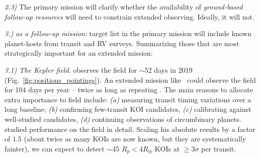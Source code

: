 \textit{2.3)} 
The primary mission will clarify whether the availability of \textit{ground-based follow-up resources} will need to constrain \tesss extended observing.
Ideally, it will not.

\textit{3.) \tess as a follow-up mission:}
\tesss target list in the primary mission will include known planet-hosts from transit and RV surveys.
Summarizing those that are most strategically important for an extended mission:

\textit{3.1) The Kepler field.} \tess observes the \kepler field for $\sim$52 days in 2019 (Fig.~\ref{fig:positions_pointings}).
An extended mission like \npole\ could observe the field for 104 days per year -- twice as long as repeating \nhemi.
The main reasons to allocate extra importance to \keplers field include:
\textit{(a)} measuring transit timing variations over a long baseline;
\textit{(b)} confirming few-transit KOI candidates, 
\textit{(c)} calibrating \tess against well-studied candidates,
\textit{(d)} continuing observations of circumbinary planets.
\citet{sullivan_KOIs_2013} studied \tesss performance on the field in detail.
Scaling his absolute results by a factor of $1.5$ (about twice as many KOIs are now known, but they are systematically fainter), we can expect \tess to detect $\sim$45 $R_p<4R_\oplus$ KOIs at $\geq3\sigma$ per transit.

